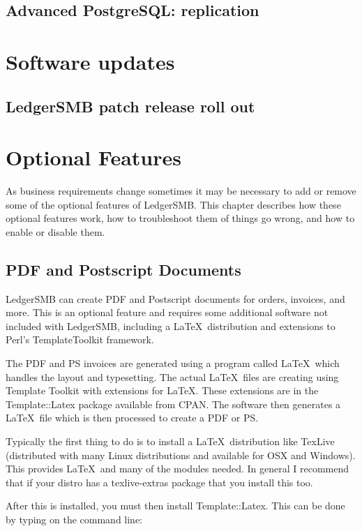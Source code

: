 \section{Advanced PostgreSQL: replication}

\chapter{Software updates}

\section{LedgerSMB patch release roll out}

\chapter{Optional Features}

As business requirements change sometimes it may be necessary to add or remove
some of the optional features of LedgerSMB.  This chapter describes how these
optional features work, how to troubleshoot them of things go wrong, and how to
enable or disable them.

\section{PDF and Postscript Documents}

LedgerSMB can create PDF and Postscript documents for orders, invoices, and
more.  This is an optional feature and requires some additional software not
included with LedgerSMB, including a \LaTeX\ distribution and extensions to 
Perl's TemplateToolkit framework.

The PDF and PS invoices are generated using a program called \LaTeX\
which handles the layout and typesetting.  The actual \LaTeX\ files are
creating using Template Toolkit with extensions for \LaTeX.  These
extensions are in the Template::Latex package available from CPAN.
The software then generates a \LaTeX\ file which is then processed to
create a PDF or PS.

Typically the first thing to do is to install a \LaTeX\ distribution
like TexLive (distributed with many Linux distributions and available
for OSX and Windows).  This provides \LaTeX\ and many of the modules
needed.   In general I recommend that if your distro has a
texlive-extras package that you install this too.

After this is installed, you must then install Template::Latex.  This
can be done by typing on the command line:

